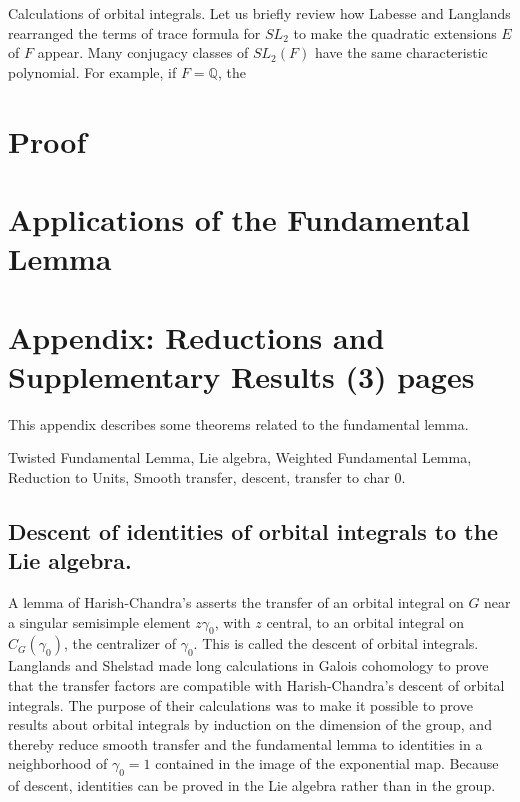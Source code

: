 \documentclass[brochure,english,12pt]{bourbaki}
\newcommand{\ring}[1]{\mathbb{#1}}
\begin{document}
Calculations of orbital integrals.  Let us briefly review how Labesse and Langlands rearranged the terms of trace formula for $SL_2$ to make the quadratic extensions $E$ of $F$ appear.  Many conjugacy classes of $SL_2(F)$ have the same characteristic polynomial.  For example, if $F=\ring{Q}$,
the 

\section{Proof} %

\section{Applications of the Fundamental Lemma}  




\section{Appendix: Reductions and Supplementary Results (3) pages}



This appendix describes some theorems related to the fundamental lemma.

Twisted Fundamental Lemma, Lie algebra, Weighted Fundamental Lemma, Reduction to Units, Smooth transfer, descent, transfer to char 0.

\subsection{Descent of identities of orbital integrals to the Lie algebra.}

A lemma of Harish-Chandra's asserts the transfer of an orbital
integral on $G$ near a singular semisimple element $z\gamma_0$, with
$z$ central, to an orbital integral on $C_G(\gamma_0)$, the
centralizer of $\gamma_0$.  This is called the descent of orbital
integrals.  Langlands and Shelstad made long calculations in
Galois cohomology to prove that the transfer factors are compatible
with Harish-Chandra's descent of orbital integrals.  The purpose of
their calculations was to make it possible to prove results about
orbital integrals by induction on the dimension of the group, and
thereby reduce smooth transfer and the fundamental lemma to identities
in a neighborhood of $\gamma_0=1$ contained in the image of the
exponential map.  Because of descent, identities can be proved in the
Lie algebra rather than in the group.
\end{document}
